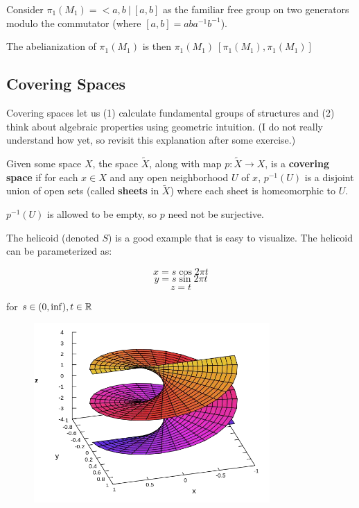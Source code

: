 \documentclass[10pt]{article}
\begin{document}
\begin{note}[Abelianization of $\pi_1(M_1)$]
	Consider $\pi_1(M_1) = < a, b ~|~ [a, b]$ as the familiar free group on two
	generators modulo the commutator (where $[a, b] = aba^{-1}b^{-1}$).

	The abelianization of $\pi_1(M_1)$ is then $\pi_1(M_1) \ [\pi_1(M_1), \pi_1(M_1)]$
\end{note}

\subsection{Covering Spaces}

Covering spaces let us (1) calculate fundamental groups of structures and (2)
think about algebraic properties using geometric intuition. (I do not really
understand how yet, so revisit this explanation after some exercise.)

\begin{definition}

	Given some space $X$, the space $\tilde{X}$, along with map $p: \tilde{X} \to
	X$, is a \textbf{covering space} if for each $x \in X$ and any open neighborhood
	$U$ of $x$, $p^{-1}(U)$ is a disjoint union of open sets (called
	\textbf{sheets} in $\tilde{X}$) where each sheet is homeomorphic to $U$.
	
	$p^{-1}(U)$ is allowed to be empty, so $p$ need not be surjective.

\end{definition}

The helicoid (denoted $S$) is a good example that is easy to visualize. The helicoid can be
parameterized as: 

\[x = s \cos 2\pi t \]
\[y = s \sin 2\pi t \]
\[z = t \]

for $s \in (0, \inf), t \in \mathbb{R}$

\begin{figure}[ht!]
\centering
\includegraphics[width=90mm]{./helicoid.png}
\caption{}
\end{figure}
\end{document}
